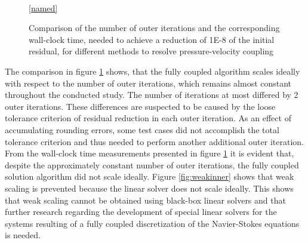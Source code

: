 \begin{figure}[h!]
  \begin{center}
    \\
  \ref{named}
  \end{center}
  \caption{Comparison of the number of outer iterations and the corresponding wall-clock time, needed to achieve a reduction of 1E-8 of the initial residual, for different methods to resolve pressure-velocity coupling}
  \label{fig:weak}
\end{figure}

The comparison in figure \ref{fig:weak} shows, that the fully coupled algorithm scales ideally with respect to the number of outer iterations, which remains almost constant throughout the conducted study. The number of iterations at most differed by 2 outer iterations. These differences are suspected to be caused by the loose tolerance criterion of residual reduction in each outer iteration. As an effect of accumulating rounding errors, some test cases did not accomplish the total tolerance criterion and thus needed to perform another additional outer iteration. From the wall-clock time measurements presented in figure \ref{fig:weak} it is evident that, despite the approximately constant number of outer iterations, the fully coupled solution algorithm did not scale ideally. Figure \ref{fig:weakinner} shows that weak scaling is prevented because the linear solver does not scale ideally. This shows that weak scaling cannot be obtained using black-box linear solvers and that further research regarding the development of special linear solvers for the systems resulting of a fully coupled discretization of the Navier-Stokes equations is needed.

